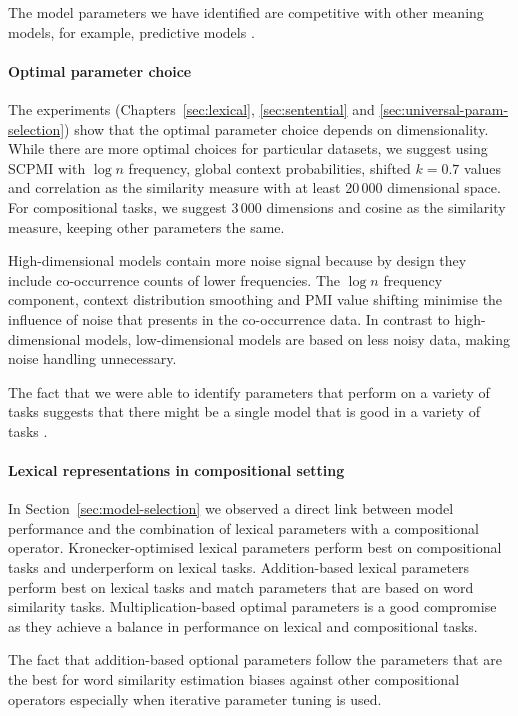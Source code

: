 \documentclass[11pt,a4paper,english,oneside]{book}
\renewcommand\cite\citep
\begin{document}
The model parameters we have identified are competitive with other meaning models, for example, predictive models \cite{mikolov2013efficient}.

\paragraph{Optimal parameter choice}

The experiments (Chapters~\ref{sec:lexical}, \ref{sec:sentential} and \ref{sec:universal-param-selection}) show that the optimal parameter choice depends on dimensionality. While there are more optimal choices for particular datasets, we suggest using SCPMI with $\log n$ frequency, global context probabilities, shifted $k=0.7$ values and correlation as the similarity measure with at least 20\,000 dimensional space. For compositional tasks, we suggest 3\,000 dimensions and cosine as the similarity measure, keeping other parameters the same.

High-dimensional models contain more noise signal because by design they include co-occurrence counts of lower frequencies. The $\log n$ frequency component, context distribution smoothing and PMI value shifting minimise the influence of noise that presents in the co-occurrence data. In contrast to high-dimensional models, low-dimensional models are based on less noisy data, making noise handling unnecessary.

The fact that we were able to identify parameters that perform on a variety of tasks suggests that there might be a single model that is good in a variety of tasks \cite{doi:10.1080/02643294.2016.1176907}.

\paragraph{Lexical representations in compositional setting}

In Section~\ref{sec:model-selection} we observed a direct link between model performance and the combination of lexical parameters with a compositional operator. Kronecker-optimised lexical parameters perform best on compositional tasks and underperform on lexical tasks. Addition-based lexical parameters perform best on lexical tasks and match parameters that are based on word similarity tasks. Multiplication-based optimal parameters is a good compromise as they achieve a balance in performance on lexical and compositional tasks.

The fact that addition-based optional parameters follow the parameters that are the best for word similarity estimation biases against other compositional operators especially when iterative parameter tuning is used.
\end{document}
